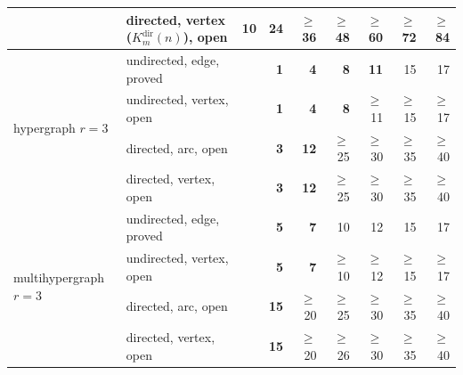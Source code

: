 \begin{tabular}{llrrrrrrr}
 & directed, vertex ($K_m^{\mathrm{dir}}(n)$), \textcolor{vtOpen}{open} & \textcolor{vtExact}{\textbf{10}} & \textcolor{vtExact}{\textbf{24}} & \textcolor{vtOpen}{$\ge$36} & \textcolor{vtOpen}{$\ge$48} & \textcolor{vtOpen}{$\ge$60} & \textcolor{vtOpen}{$\ge$72} & \textcolor{vtOpen}{$\ge$84} \\
\midrule
\multirow{4}{*}{hypergraph $r=3$} & undirected, edge, \textcolor{vtProved}{proved} &  & \textcolor{vtExact}{\textbf{1}} & \textcolor{vtExact}{\textbf{4}} & \textcolor{vtExact}{\textbf{8}} & \textcolor{vtExact}{\textbf{11}} & \textcolor{vtProved}{15} & \textcolor{vtProved}{17} \\
 & undirected, vertex, \textcolor{vtOpen}{open} &  & \textcolor{vtExact}{\textbf{1}} & \textcolor{vtExact}{\textbf{4}} & \textcolor{vtExact}{\textbf{8}} & \textcolor{vtOpen}{$\ge$11} & \textcolor{vtOpen}{$\ge$15} & \textcolor{vtOpen}{$\ge$17} \\
 & directed, arc, \textcolor{vtOpen}{open} &  & \textcolor{vtExact}{\textbf{3}} & \textcolor{vtExact}{\textbf{12}} & \textcolor{vtOpen}{$\ge$25} & \textcolor{vtOpen}{$\ge$30} & \textcolor{vtOpen}{$\ge$35} & \textcolor{vtOpen}{$\ge$40} \\
 & directed, vertex, \textcolor{vtOpen}{open} &  & \textcolor{vtExact}{\textbf{3}} & \textcolor{vtExact}{\textbf{12}} & \textcolor{vtOpen}{$\ge$25} & \textcolor{vtOpen}{$\ge$30} & \textcolor{vtOpen}{$\ge$35} & \textcolor{vtOpen}{$\ge$40} \\
\midrule
\multirow{4}{*}{multihypergraph $r=3$} & undirected, edge, \textcolor{vtProved}{proved} &  & \textcolor{vtExact}{\textbf{5}} & \textcolor{vtExact}{\textbf{7}} & \textcolor{vtProved}{10} & \textcolor{vtProved}{12} & \textcolor{vtProved}{15} & \textcolor{vtProved}{17} \\
 & undirected, vertex, \textcolor{vtOpen}{open} &  & \textcolor{vtExact}{\textbf{5}} & \textcolor{vtExact}{\textbf{7}} & \textcolor{vtOpen}{$\ge$10} & \textcolor{vtOpen}{$\ge$12} & \textcolor{vtOpen}{$\ge$15} & \textcolor{vtOpen}{$\ge$17} \\
 & directed, arc, \textcolor{vtOpen}{open} &  & \textcolor{vtExact}{\textbf{15}} & \textcolor{vtOpen}{$\ge$20} & \textcolor{vtOpen}{$\ge$25} & \textcolor{vtOpen}{$\ge$30} & \textcolor{vtOpen}{$\ge$35} & \textcolor{vtOpen}{$\ge$40} \\
 & directed, vertex, \textcolor{vtOpen}{open} &  & \textcolor{vtExact}{\textbf{15}} & \textcolor{vtOpen}{$\ge$20} & \textcolor{vtOpen}{$\ge$26} & \textcolor{vtOpen}{$\ge$30} & \textcolor{vtOpen}{$\ge$35} & \textcolor{vtOpen}{$\ge$40} \\
\bottomrule
\end{tabular}

